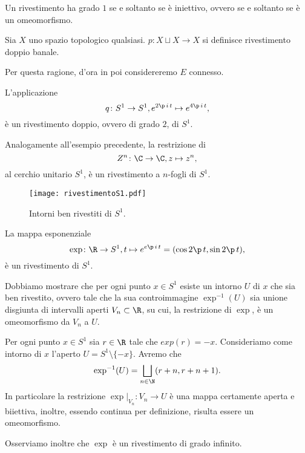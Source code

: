 \begin{oss}
	Un rivestimento ha grado \(1\) se e soltanto se è iniettivo, ovvero se e soltanto se è un omeomorfismo.
\end{oss}

\begin{ese}
	Sia \(X\) uno spazio topologico qualsiasi.
	\(p\colon X\sqcup X\to X\) si definisce rivestimento doppio banale.
\end{ese}

\begin{oss}
	Per questa ragione, d'ora in poi considereremo \(E\) connesso.
\end{oss}
%
%
\begin{ese}
	L'applicazione
	\[
		q \colon S^1 \to S^1, e^{2\p\,i\,t} \mapsto e^{4\p\,i\,t},
	\]
	è un rivestimento doppio, ovvero di grado \(2\), di \(S^1\).
\end{ese}

\begin{ese}
	Analogamente all'esempio precedente, la restrizione di
	\[
		Z^n \colon \C \to \C, z \mapsto z^n,
	\]
	al cerchio unitario \(S^1\), è un rivestimento a \(n\)-fogli di \(S^1\).
\end{ese}

\begin{figure}[tp]
	\begin{centering}
		\texttt{[image: rivestimentoS1.pdf]}
		\caption{Intorni ben rivestiti di \(S^1\).}
		\label{fig:rivestimentoS1}
	\end{centering}
\end{figure}

\begin{ese}
	La mappa esponenziale
	\[
		\exp\colon \R \to S^1, t \mapsto e^{e\p\,i\,t} = (\cos 2\p\,t, \sin 2\p\,t),
	\]
	è un rivestimento di \(S^1\).

	Dobbiamo mostrare che per ogni punto \(x\in S^1\) esiste un intorno \(U\) di \(x\) che sia ben rivestito, ovvero tale che la sua controimmagine \(\exp^{-1}(U)\) sia unione disgiunta di intervalli aperti \(V_n\subset \R\), su cui, la restrizione di \(\exp\), è un omeomorfismo da \(V_n\) a \(U\).

	Per ogni punto \(x\in S^1\) sia \(r\in\R\) tale che \(exp(r)=-x\).
	Consideriamo come intorno di \(x\) l'aperto \(U=S^1\setminus \{-x\}\).
	Avremo che
	\[
		\exp^{-1}(U) = \bigsqcup_{n\in\N} (r+n,r+n+1).
	\]
	In particolare la restrizione \(\exp|_{V_n}\colon V_n \to U\) è una mappa certamente aperta e biiettiva, inoltre, essendo continua per definizione, risulta essere un omeomorfismo.

	Osserviamo inoltre che \(\exp\) è un rivestimento di grado infinito.
\end{ese}

